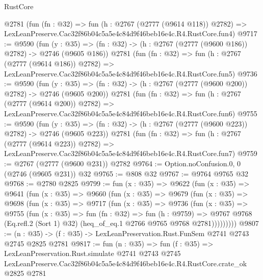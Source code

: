 \begin{lexlean}{RustCore}
\begin{coremodule}
    @2781
    (fun (fn : @32) =>
    fun (h : @2767 (@2777 (@9614 @118)) @2782) =>
    LexLeanPreserve.Cac32f86b04c5a5e4c84d9f46beb16e4c.R4.RustCore.fun4)
@9717 := @9590
    (fun (y : @35) => (fn : @32) -> (h : @2767 (@2777 (@9600 @186)) @2782) -> @2746 (@9605 @186))
    @2781
    (fun (fn : @32) =>
    fun (h : @2767 (@2777 (@9614 @186)) @2782) =>
    LexLeanPreserve.Cac32f86b04c5a5e4c84d9f46beb16e4c.R4.RustCore.fun5)
@9736 := @9590
    (fun (y : @35) => (fn : @32) -> (h : @2767 (@2777 (@9600 @200)) @2782) -> @2746 (@9605 @200))
    @2781
    (fun (fn : @32) =>
    fun (h : @2767 (@2777 (@9614 @200)) @2782) =>
    LexLeanPreserve.Cac32f86b04c5a5e4c84d9f46beb16e4c.R4.RustCore.fun6)
@9755 := @9590
    (fun (y : @35) => (fn : @32) -> (h : @2767 (@2777 (@9600 @223)) @2782) -> @2746 (@9605 @223))
    @2781
    (fun (fn : @32) =>
    fun (h : @2767 (@2777 (@9614 @223)) @2782) =>
    LexLeanPreserve.Cac32f86b04c5a5e4c84d9f46beb16e4c.R4.RustCore.fun7)
@9759 := @2767 (@2777 (@9600 @231)) @2782
@9764 := Option.noConfusion.{0, 0} (@2746 (@9605 @231)) @32
@9765 := @808 @32
@9767 := @9764 @9765 @32
@9768 := @2780 @2825
@9799 := fun (x : @35) =>
  @9622
    (fun (x : @35) =>
    @9641
      (fun (x : @35) =>
      @9660
        (fun (x : @35) =>
        @9679
          (fun (x : @35) =>
          @9698
            (fun (x : @35) =>
            @9717
              (fun (x : @35) =>
              @9736
                (fun (x : @35) =>
                @9755
                  (fun (x : @35) =>
                  fun (fn : @32) =>
                  fun (h : @9759) =>
                  @9767
                    @9768
                    (Eq.refl.{2} (Sort 1) @32)
                    (heq_of_eq.{1} @2766 @9765 @9768 @2781)))))))))
@9807 := (n : @35) -> (f : @35) -> LexLeanPreservation.Rust.FunSem @2741 @2743 @2745 @2825 @2781
@9817 := fun (n : @35) =>
  fun (f : @35) =>
  LexLeanPreservation.Rust.simulate
    @2741
    @2743
    @2745
    LexLeanPreserve.Cac32f86b04c5a5e4c84d9f46beb16e4c.R4.RustCore.crate_ok
    @2825
    @2781
\end{coremodule}
\end{lexlean}
